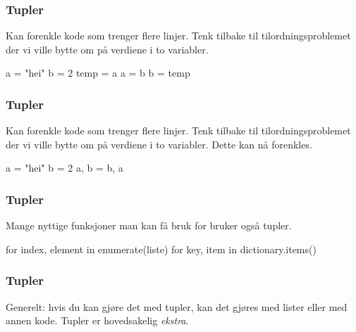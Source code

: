 \begin{frame}[fragile]
    \frametitle{Tupler}

    Kan forenkle kode som trenger flere linjer. Tenk tilbake til tilordningsproblemet der vi ville bytte om på verdiene i to variabler.

\begin{python}
a = "hei"
b = 2
temp = a
a = b
b = temp
\end{python}

\end{frame}

\begin{frame}[fragile]
    \frametitle{Tupler}

    Kan forenkle kode som trenger flere linjer. Tenk tilbake til tilordningsproblemet der vi ville bytte om på verdiene i to variabler. Dette kan nå forenkles. 

\begin{python}
a = "hei"
b = 2
a, b = b, a
\end{python}

\end{frame}

\begin{frame}[fragile]
    \frametitle{Tupler}

    Mange nyttige funksjoner man kan få bruk for bruker også tupler. 

\begin{python}
for index, element in enumerate(liste)
for key, item in dictionary.items()
\end{python}

\end{frame}

\begin{frame}
    \frametitle{Tupler}

    Generelt: hvis du kan gjøre det med tupler, kan det gjøres med lister eller med annen kode. Tupler er hovedsakelig \textit{ekstra}. 

\end{frame}



